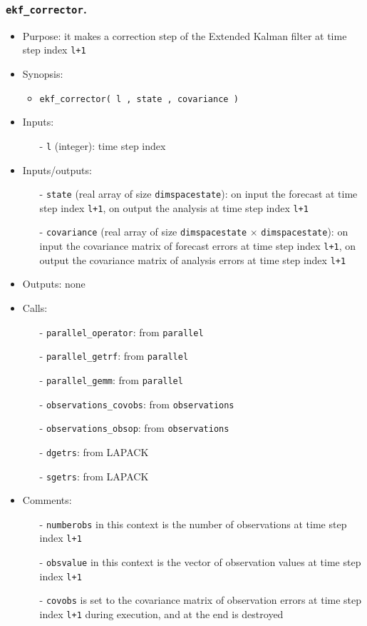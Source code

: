 \documentclass[12pt]{article}
\begin{document}
\subsubsection{{\tt ekf\_corrector}.}
\begin{itemize}
\item Purpose: it makes a correction step of the Extended Kalman filter at time step index {\tt l+1}
\item Synopsis:
\begin{itemize}
\item {\tt ekf\_corrector( l , state , covariance )}
\end{itemize}
\item Inputs: 
\begin{itemize}
\item[-] {\tt l} (integer): time step index
\end{itemize}
\item Inputs/outputs: 
\begin{itemize}
\item[-] {\tt state} (real array of size {\tt dimspacestate}): on input the forecast at time step index {\tt l+1}, on output the analysis at time step index {\tt l+1}
\item[-] {\tt covariance} (real array of size {\tt dimspacestate} $\times$ {\tt dimspacestate}): on input the covariance matrix of forecast errors at time step index {\tt l+1}, on output the covariance matrix of analysis errors at time step index {\tt l+1}
\end{itemize}
\item Outputs: none
\item Calls: 
\begin{itemize}
\item[-] {\tt parallel\_operator}: from {\tt parallel}
\item[-] {\tt parallel\_getrf}: from {\tt parallel}
\item[-] {\tt parallel\_gemm}: from {\tt parallel}
\item[-] {\tt observations\_covobs}: from {\tt observations}
\item[-] {\tt observations\_obsop}: from {\tt observations}
\item[-] {\tt dgetrs}: from LAPACK
\item[-] {\tt sgetrs}: from LAPACK
\end{itemize}
\item Comments: 
\begin{itemize}
\item[-] {\tt numberobs} in this context is the number of observations at time step index {\tt l+1}
\item[-] {\tt obsvalue} in this context is the vector of observation values at time step index {\tt l+1}
\item[-] {\tt covobs} is set to the covariance matrix of observation errors at time step index {\tt l+1} during execution, and at the end is destroyed 
\end{itemize}
\end{itemize} 
\end{document}
